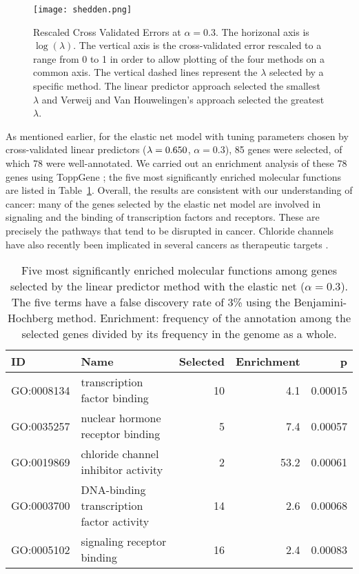 \begin{figure}[h]
  \centering
  \texttt{[image: shedden.png]}
  \caption{\label{fig:CVE}Rescaled Cross Validated Errors at $\alpha = 0.3$. The horizonal axis is $\log(\lambda)$. The vertical axis is the cross-validated error rescaled to a range from 0 to 1 in order to allow plotting of the four methods on a common axis. The vertical dashed lines represent the $\lambda$ selected by a specific method. The linear predictor approach selected the smallest $\lambda$ and Verweij and Van Houwelingen's approach selected the greatest $\lambda$.}
\end{figure}

As mentioned earlier, for the elastic net model with tuning parameters chosen by cross-validated linear predictors ($\lambda = 0.650$, $\alpha = 0.3$), 85 genes were selected, of which 78 were well-annotated.  We carried out an enrichment analysis of these 78 genes using ToppGene \citep{Chen2009c}; the five most significantly enriched molecular functions are listed in Table~\ref{Tab:go}.  Overall, the results are consistent with our understanding of cancer: many of the genes selected by the elastic net model are involved in signaling and the binding of transcription factors and receptors.  These are precisely the pathways that tend to be disrupted in cancer.  Chloride channels have also recently been implicated in several cancers as therapeutic targets \citep{Peretti2015}.

\begin{table}[ht]
\centering
\caption{\label{Tab:go} Five most significantly enriched molecular functions among genes selected by the linear predictor method with the elastic net ($\alpha=0.3$).  The five terms have a false discovery rate of 3\% using the Benjamini-Hochberg method. Enrichment: frequency of the annotation among the selected genes divided by its frequency in the genome as a whole.}
\begin{tabular}{llrrr}
\toprule
ID & Name & Selected & Enrichment & p \\
\midrule
GO:0008134 & transcription factor binding & 10 & 4.1 & 0.00015 \\
GO:0035257 & nuclear hormone receptor binding & 5 & 7.4 & 0.00057 \\
GO:0019869 & chloride channel inhibitor activity & 2 & 53.2 & 0.00061 \\
GO:0003700 & DNA-binding transcription factor activity & 14 & 2.6 & 0.00068 \\
GO:0005102 & signaling receptor binding & 16 & 2.4 & 0.00083 \\
\bottomrule
\end{tabular}
\end{table}


